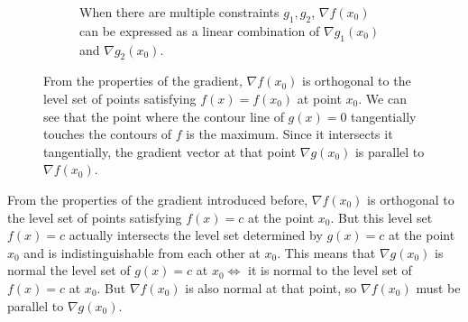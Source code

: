 \begin{figure}[H]
\begin{subfigure}[b]{0.48\textwidth}
{%
			}
			\caption{When there are multiple constraints $g_1, g_2$, $\nabla f(x_0)$ can be expressed as a linear combination of $\nabla g_1 (x_0)$ and $\nabla g_2 (x_0)$.}
		\end{subfigure}
		\caption{From the properties of the gradient, $\nabla f(x_0)$ is orthogonal to the level set of points satisfying $f(x) = f(x_0)$ at point $x_0$. We can see that the point where the contour line of $g(x) = 0$ tangentially touches the contours of $f$ is the maximum. Since it intersects it tangentially, the gradient vector at that point $\nabla g(x_0)$ is parallel to $\nabla f(x_0)$.}
		\label{fig:lagrange_constraint_contours}
	\end{figure}

  From the properties of the gradient introduced before, $\nabla f(x_0)$ is orthogonal to the level set of points satisfying $f(x) = c$ at the point $x_0$. But this level set $f(x) = c$ actually intersects the level set determined by $g(x) = c$ at the point $x_0$ and is indistinguishable from each other at $x_0$. This means that $\nabla g(x_0)$ is normal the level set of $g(x) = c$ at $x_0 \iff $ it is normal to the level set of $f(x) = c$ at $x_0$. But $\nabla f(x_0)$ is also normal at that point, so $\nabla f(x_0)$ must be parallel to $\nabla g(x_0)$. 

